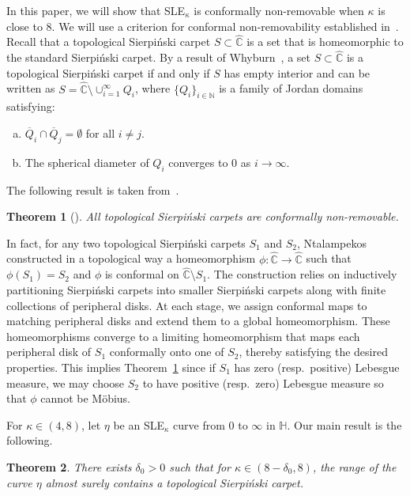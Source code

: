 \documentclass[a4paper]{article}
\numberwithin{equation}{section}
\newtheorem{theorem}{Theorem}[section]
\numberwithin{equation}{section}
\renewcommand{\1}{\mathbf{1}}
\begin{document}
In this paper, we will show that SLE$_\kappa$ is conformally non-removable when $\kappa$ is close to 8. We will use a criterion for conformal non-removability established in~\cite{Ntalampekos-carpet}. Recall that a topological Sierpi\'nski carpet $S\subset \widehat{\mathbb{C}}$ is a set that is homeomorphic to the standard Sierpi\'nski carpet. By a result of Whyburn~\cite{Whyburn-carpet}, a set $S \subset \widehat{\mathbb{C}}$ is a topological Sierpi\'nski carpet if and only if $S$ has empty interior and can be written as $S = \widehat{\mathbb{C}} \setminus \cup_{i=1}^\infty Q_i$, where $\{Q_i\}_{i \in \mathbb{N}}$ is a family of Jordan domains satisfying:
\begin{enumerate}[(a)]
    \item $\overline{Q}_i \cap \overline{Q}_j = \emptyset$ for all $i \neq j$.
    \item The spherical diameter of $Q_i$ converges to 0 as $i \to \infty$.
\end{enumerate}
The following result is taken from~\cite[Theorem 1.1]{Ntalampekos-carpet}.

\begin{theorem}[\cite{Ntalampekos-carpet}]\label{thm:carpet-non-remove}
    All topological Sierpi\'nski carpets are conformally non-removable.
\end{theorem}

In fact, for any two topological Sierpi\'nski carpets $S_1$ and $S_2$, Ntalampekos~\cite{Ntalampekos-carpet} constructed in a topological way a homeomorphism $\phi: \widehat{\mathbb{C}} \to \widehat{\mathbb{C}}$ such that $\phi(S_1) = S_2$ and $\phi$ is conformal on $\widehat{\mathbb{C}} \setminus S_1$. The construction relies on inductively partitioning Sierpi\'nski carpets into smaller Sierpi\'nski carpets along with finite collections of peripheral disks. At each stage, we assign conformal maps to matching peripheral disks and extend them to a global homeomorphism. These homeomorphisms converge to a limiting homeomorphism that maps each peripheral disk of $S_1$ conformally onto one of $S_2$, thereby satisfying the desired properties. This implies Theorem~\ref{thm:carpet-non-remove} since if $S_1$ has zero (resp.\ positive) Lebesgue measure, we may choose $S_2$ to have positive (resp.\ zero) Lebesgue measure so that $\phi$ cannot be M\"obius.


For $\kappa \in (4,8)$, let $\eta$ be an SLE$_\kappa$ curve from $0$ to $\infty$ in $\mathbb{H}$. Our main result is the following.

\begin{theorem}\label{thm:carpet}
     There exists $\delta_0>0$ such that for $\kappa \in (8 - \delta_0,8)$, the range of the curve $\eta$ almost surely contains a topological Sierpi\'nski carpet.
\end{theorem}
\end{document}
